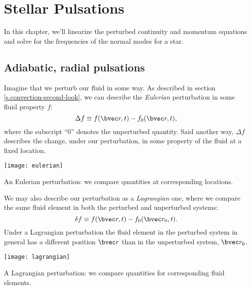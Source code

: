 
\chapter{Stellar Pulsations}\label{s.pulsations}

In this chapter, we'll linearize the perturbed continuity and momentum equations and solve for the frequencies of the normal modes for a star.

\section{Adiabatic, radial pulsations}\label{s.adiabatic-radial}
Imagine that we perturb our fluid in some way.
As described in section \ref{s.convection-second-look}, we can describe the \emph{Eulerian} perturbation in some fluid property $f$:
\begin{equation}
  \Delta f \equiv f(\vr,t)-f_{0}(\vr,t),
\end{equation}
where the subscript ``0'' denotes the unperturbed quantity. Said another way, $\Delta f$ describes the change, under our perturbation, in some property of the fluid at a fixed location.
\begin{marginfigure}[-12\baselineskip]
\texttt{[image: eulerian]}
\caption{\label{f.eulerian-grid} An Eulerian perturbation: we compare quantities at corresponding locations.}
\end{marginfigure}

We may also describe our perturbation as a \emph{Lagrangian} one, where we compare the same fluid element in both the perturbed and unperturbed systems:
\begin{equation}
 \delta f \equiv f(\vr,t) - f_{0}(\vr_{0},t).
\end{equation}
Under a Lagrangian perturbation the fluid element in the perturbed system in general has a different position $\vr$ than in the unperturbed system, $\vr_{0}$.
\begin{marginfigure}
\texttt{[image: lagrangian]}
\caption{\label{f.lagrangian-grid} A Lagrangian perturbation: we compare quantities for corresponding fluid elements.}
\end{marginfigure}


